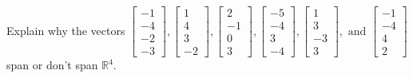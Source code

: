 \documentclass{article}
\begin{document}
\begin{exerciseStatement}
    Explain why the vectors \(\left[\begin{array}{r}
-1 \\
-4 \\
-2 \\
-3
\end{array}\right] , \left[\begin{array}{r}
1 \\
4 \\
3 \\
-2
\end{array}\right] , \left[\begin{array}{r}
2 \\
-1 \\
0 \\
3
\end{array}\right] , \left[\begin{array}{r}
-5 \\
-4 \\
3 \\
-4
\end{array}\right] , \left[\begin{array}{r}
1 \\
3 \\
-3 \\
3
\end{array}\right] , \text{ and } \left[\begin{array}{r}
-1 \\
-4 \\
4 \\
2
\end{array}\right]\) span or don't span \(\mathbb{R}^4\).



  
\end{exerciseStatement}
\end{document}

